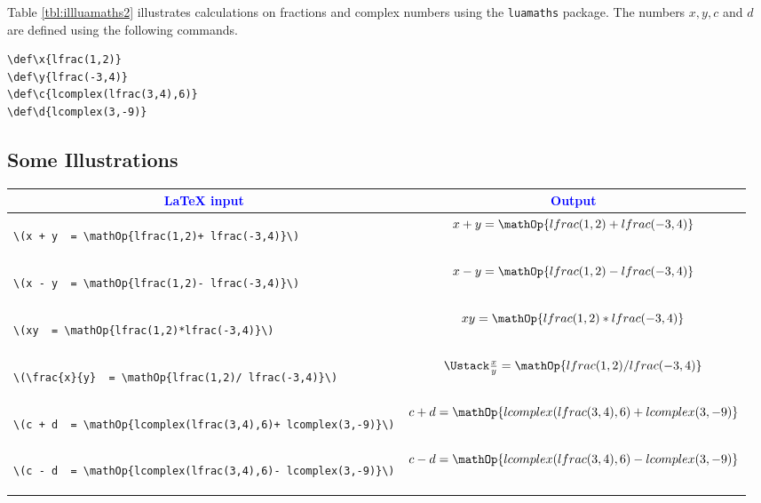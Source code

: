 \documentclass{article}
\begin{document}
Table \ref{tbl:illluamaths2} illustrates calculations on fractions and complex numbers using the \verb|luamaths| package. The numbers \(x, y, c\) and \(d\) are defined using the following commands. 
\begin{lstlisting}
\def\x{lfrac(1,2)}
\def\y{lfrac(-3,4)}
\def\c{lcomplex(lfrac(3,4),6)}
\def\d{lcomplex(3,-9)} 
\end{lstlisting}

\subsection*{Some Illustrations}
\def\x{lfrac(1,2)}
\def\y{lfrac(-3,4)}
\def\c{lcomplex(lfrac(3,4),6)}
\def\d{lcomplex(3,-9)}
\begin{center}
\begin{longtable}{lc}
\toprule
\multicolumn{1}{c}{\textcolor{blue}{LaTeX input}} &\multicolumn{1}{c}{\textcolor{blue}{Output}}  \\
\toprule
\begin{lstlisting}
\(x + y  = \mathOp{\x + \y}\)
\end{lstlisting}
& \(x + y  = \mathOp{\x + \y}\) \\ \hline

\begin{lstlisting}
\(x - y  = \mathOp{\x - \y}\)
\end{lstlisting}
& \(x - y  = \mathOp{\x - \y}\) \\ \hline

\begin{lstlisting}
\(xy  = \mathOp{\x*\y}\)
\end{lstlisting}
& \(xy  = \mathOp{\x*\y}\) \\ \hline

\begin{lstlisting}
\(\frac{x}{y}  = \mathOp{\x / \y}\)
\end{lstlisting}
& \(\frac{x}{y}  = \mathOp{\x / \y}\) \\ \hline

\begin{lstlisting}
\(c + d  = \mathOp{\c + \d}\)
\end{lstlisting}
&  \(c + d  = \mathOp{\c + \d}\) \\ \hline

\begin{lstlisting}
\(c - d  = \mathOp{\c - \d}\)
\end{lstlisting}
&  \(c - d  = \mathOp{\c - \d}\) \\ \hline


\end{longtable}
\end{center}
\end{document}
